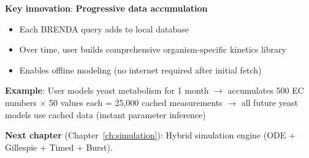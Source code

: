 \textbf{Key innovation}: \textbf{Progressive data accumulation}

\begin{itemize}
    \item Each BRENDA query adds to local database
    \item Over time, user builds comprehensive organism-specific kinetics library
    \item Enables offline modeling (no internet required after initial fetch)
\end{itemize}

\textbf{Example}: User models yeast metabolism for 1 month $\to$ accumulates 500 EC numbers $\times$ 50 values each = 25,000 cached measurements $\to$ all future yeast models use cached data (instant parameter inference)

\textbf{Next chapter} (Chapter~\ref{ch:simulation}): Hybrid simulation engine (ODE + Gillespie + Timed + Burst).
